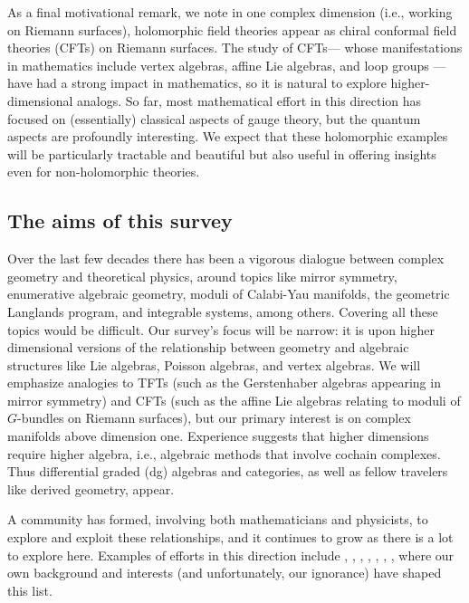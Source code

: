 \documentclass[11pt]{amsart}
\begin{document}
As a final motivational remark, we note in one complex dimension (i.e., working on Riemann surfaces), 
holomorphic field theories appear as chiral conformal field theories (CFTs) on Riemann surfaces. 
The study of CFTs--- whose manifestations in mathematics include vertex algebras, affine Lie algebras, and loop groups --- have had a strong impact in mathematics,
so it is natural to explore higher-dimensional analogs.
So far, most mathematical effort in this direction has focused on (essentially) classical aspects of gauge theory,
but the quantum aspects are profoundly interesting.
We expect that these holomorphic examples will be particularly tractable and beautiful but also useful in offering insights even for non-holomorphic theories.

\subsection{The aims of this survey}

Over the last few decades there has been a vigorous dialogue between complex geometry and theoretical physics,
around topics like mirror symmetry, enumerative algebraic geometry, moduli of Calabi-Yau manifolds, the geometric Langlands program, and integrable systems, among others.
Covering all these topics would be difficult.
Our survey's focus will be narrow:
it is upon higher dimensional versions of the relationship between geometry and algebraic structures like Lie algebras, Poisson algebras, and vertex algebras.
We will emphasize analogies to TFTs (such as the Gerstenhaber algebras appearing in mirror symmetry) and CFTs (such as the affine Lie algebras relating to moduli of $G$-bundles on Riemann surfaces),
but our primary interest is on complex manifolds above dimension one.
Experience suggests that higher dimensions require higher algebra,
i.e., algebraic methods that involve cochain complexes.
Thus differential graded (dg) algebras and categories,
as well as fellow travelers like derived geometry, appear.

A community has formed, involving both mathematicians and physicists, to explore and exploit these relationships,
and it continues to grow as there is a lot to explore here.
Examples of efforts in this direction include \cite{PTVV}, \cite{FHK}, \cite{Keviny things}, \cite{GaiottoEtAl}, \cite{Paquette}, \cite{Vicedo}, \cite{BeemBZEtAl}, 
where our own background and interests (and unfortunately, our ignorance) have shaped this list.
\end{document}
